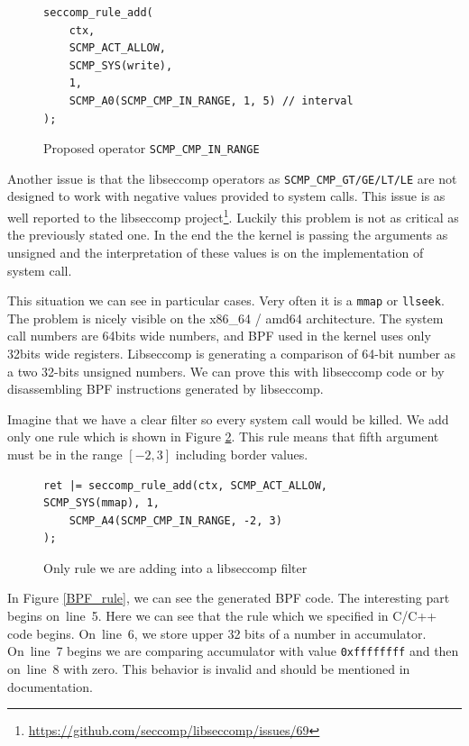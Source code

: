 \begin{figure}[h]
	\label{libseccomp_in_range}
	\lstset{style=c++}
	\begin{lstlisting}
seccomp_rule_add(
	ctx,
	SCMP_ACT_ALLOW,
	SCMP_SYS(write),
	1,
	SCMP_A0(SCMP_CMP_IN_RANGE, 1, 5) // interval
);
	\end{lstlisting}
	\caption{Proposed operator \texttt{SCMP\_CMP\_IN\_RANGE}}
\end{figure}

Another issue is that the libseccomp operators as
\texttt{SCMP\_CMP\_GT/GE/LT/LE} are not designed to work with negative values
provided to system calls. This issue is as well reported to the libseccomp
project\footnote{\url{https://github.com/seccomp/libseccomp/issues/69}}. Luckily
this problem is not as critical as the previously stated one. In the end the
the kernel is passing the arguments as unsigned and the interpretation of these values
is on the implementation of system call.

This situation we can see in particular cases. Very often it is a \texttt{mmap}
or \texttt{llseek}. The problem is nicely visible on the x86\_64 / amd64 architecture. The system call
numbers are 64bits wide numbers, and BPF used in the kernel uses only 32bits
wide registers. Libseccomp is generating a comparison of 64-bit number as a two
32-bits unsigned numbers. We can prove this with libseccomp code or by
disassembling BPF instructions generated by libseccomp.

Imagine that we have a clear filter so every system call would be killed. We add
only one rule which is shown in Figure \ref{libseccomp_rule}. This rule means
that fifth argument must be in the range $[-2, 3]$ including border values.

\begin{figure}[h]
	\label{libseccomp_rule}
	\lstset{style=c++}
	\begin{lstlisting}
ret |= seccomp_rule_add(ctx, SCMP_ACT_ALLOW, SCMP_SYS(mmap), 1,
	SCMP_A4(SCMP_CMP_IN_RANGE, -2, 3)
);
	\end{lstlisting}
	\caption{Only rule we are adding into a libseccomp filter}
\end{figure}

In Figure \ref{BPF_rule}, we can see the generated BPF code. The interesting part
begins on~line~5. Here we can see that the rule  which we specified in
C/C++ code begins. On~line~6, we store upper 32 bits of a number in accumulator.
On~line~7 begins we are comparing accumulator with value \texttt{0xffffffff} and then
on~line~8 with zero. This behavior is invalid and should be mentioned in documentation.

